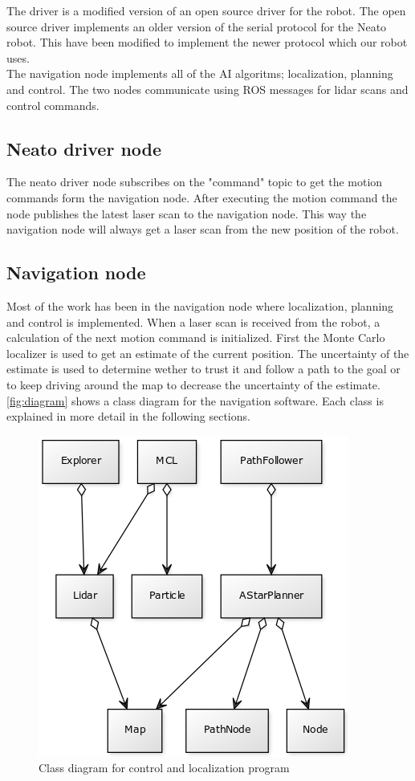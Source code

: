 The driver is a modified version of an open source driver for the robot. \cite{neatoGithub}
The open source driver implements an older version of the serial protocol for the Neato robot.
This have been modified to implement the newer protocol which our robot uses.\\

The navigation node implements all of the AI algoritms; localization, planning and control.
The two nodes communicate using ROS messages for lidar scans and control commands. 

\subsection{Neato driver node}
The neato driver node subscribes on the "command" topic to get the motion commands form the navigation node.
After executing the motion command the node publishes the latest laser scan to the navigation node.
This way the navigation node will always get a laser scan from the new position of the robot.

\subsection{Navigation node}
Most of the work has been in the navigation node where localization, planning and control is implemented.
When a laser scan is received from the robot, a calculation of the next motion command is initialized.
First the Monte Carlo localizer is used to get an estimate of the current position.
The uncertainty of the estimate is used to determine wether to trust it and follow a path to the goal or to keep driving around the map to decrease the uncertainty of the estimate.
\autoref{fig:diagram} shows a class diagram for the navigation software. Each class is explained in more detail in the following sections.

\begin{figure}[H]
\centering
\includegraphics[scale=0.40]{images/diagram}
\caption{Class diagram for control and localization program}
\label{fig:diagram}
\end{figure}

